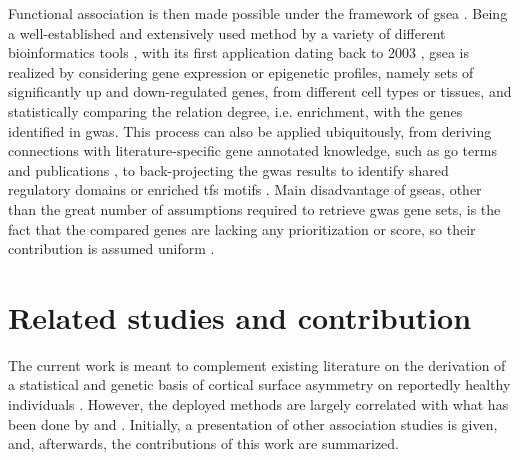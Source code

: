 Functional association is then made possible under the framework of \ac{gsea} \cite{Subramanian2005}. Being a well-established and extensively used method by a variety of different bioinformatics tools \cite{Chen2013,Watanabe2017,Liao2019}, with its first application dating back to 2003 \cite{Mootha2003}, \ac{gsea} is realized by considering gene expression or epigenetic profiles, namely sets of significantly up and down-regulated genes, from different cell types or tissues, and statistically comparing the relation degree, i.e. enrichment, with the genes identified in \ac{gwas}. This process can also be applied ubiquitously, from deriving connections with literature-specific gene annotated knowledge, such as \ac{go} terms \cite{Ashburner2000} and publications \cite{Szklarczyk2021}, to back-projecting the \ac{gwas} results to identify shared regulatory domains \cite{Janky2014} or enriched \acp{tf} motifs \cite{Heinz2010}. Main disadvantage of \acp{gsea}, other than the great number of assumptions required to retrieve \ac{gwas} gene sets, is the fact that the compared genes are lacking any prioritization or score, so their contribution is assumed uniform \cite{Wang2011}.


\section{Related studies and contribution}
The current work is meant to complement existing literature on the derivation of a statistical and genetic basis of cortical surface asymmetry on reportedly healthy individuals \cite{Sha2021,Kong2018,Kong2021,Zhao2022}. However, the deployed methods are largely correlated with what has been done by \citet{Naqvi2021} and \citet{Claes2018}. Initially, a presentation of other association studies is given, and, afterwards, the contributions of this work are summarized.

